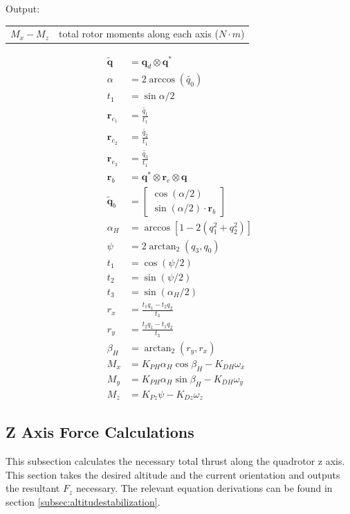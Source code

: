 \documentclass{article}
\numberwithin{equation}{section} %
\newcommand{\bs}[1]{\boldsymbol{#1}}
\begin{document}
\bigskip

Output:
\begin{tabular}{l l}
	$ M_{x} - M_{z} $		& total rotor moments along each axis ($N \cdot m$) \\
\end{tabular}



{\allowdisplaybreaks \begin{align}
\tilde{\bs{q}} &= \bs{q}_d \otimes \bs{q}^* \\%
\alpha &= 2\arccos{\left(\tilde{q_0}\right)} \\%
t_1 &= \sin{\alpha/2} \\
\bs{r}_{e_1} &= \frac{\tilde{q_1}}{t_1} \\
\bs{r}_{e_2} &= \frac{\tilde{q_2}}{t_1} \\
\bs{r}_{e_3} &= \frac{\tilde{q_3}}{t_1} \\
\bs{r}_b &= \bs{q}^* \otimes \bs{r}_e \otimes \bs{q} \\
\tilde{\bs{q}}_b &= 
\begin{bmatrix}
	\cos \left( \alpha / 2 \right) \\
	\sin \left( \alpha / 2 \right) \cdot \bs{r}_b
\end{bmatrix} \\
	\alpha_H &= \arccos \left[1 - 2 \left( q_1^2 + q_2^2 \right) \right] \\
	\psi &= 2 \arctan_2 \left( q_3, q_0 \right) \\
	t_1 &= \cos \left( \psi / 2 \right) \\
	t_2 &= \sin \left( \psi / 2 \right) \\
	t_3 &= \sin \left( \alpha_H / 2 \right) \\
	r_x &=   \frac{ t_1 q_1 - t_2 q_2}{ t_3} \\
	r_y &=   \frac{t_2 q_1 - t_1 q_2} { t_3 }  \\
	\beta_H &= \arctan_2 \left(r_y, r_x \right) \\
	M_x &= K_{PH} \alpha_H \cos \beta_H - K_{DH} \omega_x \\
	M_y &= K_{PH} \alpha_H \sin \beta_H - K_{DH} \omega_y \\
	M_z &= K_{Pz} \psi - K_{Dz} \omega_z
\end{align}}


\subsection{Z Axis Force Calculations} \label{subsec:zaxisforcecalculations}
This subsection calculates the necessary total thrust along the quadrotor z axis. This section takes the desired altitude and the current orientation and outputs the resultant $F_z$ necessary. The relevant equation derivations can be found in section \ref{subsec:altitudestabilization}.
\end{document}
